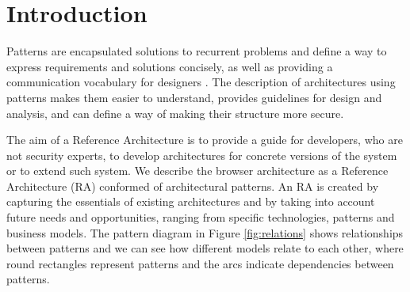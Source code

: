 \documentclass[prodmode,acmtecs]{acmsmall}
\begin{document}
%
%






\maketitle
\section{Introduction}
Patterns are encapsulated solutions to recurrent problems and define a way to express requirements and solutions concisely, as well as providing a communication vocabulary for designers \cite{gamma1994design,buschman1996system}. The description of architectures using patterns makes them easier to understand, provides guidelines for design and analysis, and can define a way of making their structure more secure.

The aim of a Reference Architecture is to provide a guide for developers, who are not security experts, to develop architectures for concrete versions of the system or to extend such system. We describe the browser architecture as a Reference Architecture (RA) conformed of architectural patterns. An RA is created by capturing the essentials of existing architectures and by taking into account future needs and opportunities, ranging from specific technologies, patterns and business models. The pattern diagram \cite{buschman1996system} in Figure \ref{fig:relations} shows relationships between patterns and we can see how different models relate to each other, where round rectangles represent patterns and the arcs indicate dependencies between patterns. 
\end{document}
